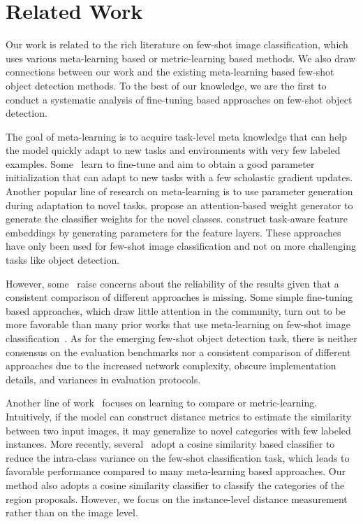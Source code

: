 \section{Related Work}
Our work is related to the rich literature on few-shot image classification, which uses various 
meta-learning based or metric-learning based methods. We also draw connections between our work and the existing meta-learning based few-shot object detection methods. To the best of our knowledge, we are the first to conduct a systematic analysis of fine-tuning based approaches on few-shot object detection. 

 The goal of meta-learning is to acquire task-level meta knowledge that
can help the model quickly adapt to new tasks and environments with very few labeled examples.  Some~\cite{finn2017model,rusu2018meta,nichol2018reptile} learn to fine-tune and aim to obtain a good parameter initialization that can adapt to
new tasks with a few scholastic gradient updates. Another popular line of research on meta-learning is to use parameter generation during adaptation to novel tasks. \citet{gidaris2018dynamic} propose an attention-based weight generator to generate the classifier weights for the novel classes. \citet{wang2019tafe} construct task-aware feature embeddings by generating parameters for the feature layers. These approaches have only been used for few-shot image 
classification and not on more challenging tasks like object detection.

However, some~\cite{chen2019closer} 
raise concerns about the reliability of the results given 
that a consistent comparison of different approaches is missing. 
Some simple fine-tuning based approaches, which draw little attention in the
community, turn out to be more favorable than many prior works that use meta-learning
on few-shot image classification~\cite{chen2019closer,dhillon2019baseline}.
As for the emerging few-shot object detection task, there is neither consensus on the evaluation benchmarks nor a consistent comparison of different approaches due to the increased network complexity, obscure implementation details, and variances in evaluation protocols.

 Another line of work~\cite{koch2015siamese,snell2017prototypical,vinyals2016matching}
focuses on learning to compare or metric-learning. Intuitively, if the model can construct distance metrics to 
estimate the similarity between two input images, it may generalize to 
novel categories with few labeled instances. More recently, several~\cite{chen2019closer,gidaris2018dynamic,qi2018low} adopt a 
cosine similarity based classifier to reduce the intra-class variance on the few-shot classification task, which leads to favorable performance compared to many 
meta-learning based approaches. Our method also adopts a cosine
similarity classifier to classify the categories of the region proposals. However, we focus on the instance-level distance measurement rather than on the image level.

